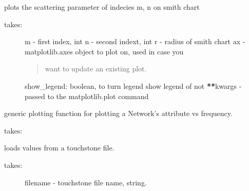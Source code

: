\documentclass[letterpaper,10pt,english]{sphinxmanual}
\begin{document}
\begin{fulllineitems}
\begin{fulllineitems}
\end{fulllineitems}


\begin{fulllineitems}
\label{auto_network:mwavepy.Network.plot_s_smith}
plots the scattering parameter of indecies m, n on smith chart
\begin{description}
\item[{takes:}] \leavevmode
m - first index, int
n - second indext, int
r -  radius of smith chart
ax - matplotlib.axes object to plot on, used in case you
\begin{quote}

want to update an existing plot.
\end{quote}

show\_legend: boolean, to turn legend show legend of not
{\color{red}\bfseries{}**}kwargs - passed to the matplotlib.plot command

\end{description}

\end{fulllineitems}


\begin{fulllineitems}
\label{auto_network:mwavepy.Network.plot_vs_frequency_generic}
generic plotting function for plotting a Network's attribute
vs frequency.

takes:

\end{fulllineitems}


\begin{fulllineitems}
\label{auto_network:mwavepy.Network.read_touchstone}
loads  values from a touchstone file.
\begin{description}
\item[{takes:}] \leavevmode
filename - touchstone file name, string.


\end{description}
\end{fulllineitems}
\end{fulllineitems}
\end{document}
